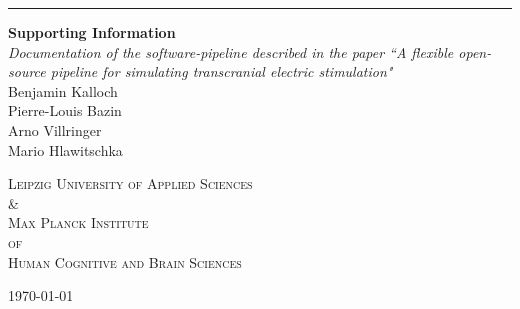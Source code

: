 \begin{titlepage}
    \raggedleft %
    
    \rule{1pt}{0.70\textheight}     %
    \hspace{0.05\textwidth}         %
    \parbox[b]{0.70\textwidth}{     %
        {\Huge\bfseries Supporting Information}\\[2\baselineskip] %
        {\large\textit{Documentation of the software-pipeline described in the paper ``A flexible open-source pipeline for simulating transcranial electric stimulation"}}\\[4\baselineskip] %
        {Benjamin Kalloch}\\
        {Pierre-Louis Bazin}\\
        {Arno Villringer}\\
        {Mario Hlawitschka} 
        
        \vspace{0.15\textheight} %
    }
   \begin{center}
      {\noindent \textsc{Leipzig University of Applied Sciences \\\&\\ Max Planck Institute\\of\\Human Cognitive and Brain Sciences}} %
   \end{center}
   \vspace{0.05\textheight} %
   
   \begin{center}
      {\today}
   \end{center}
\end{titlepage}
